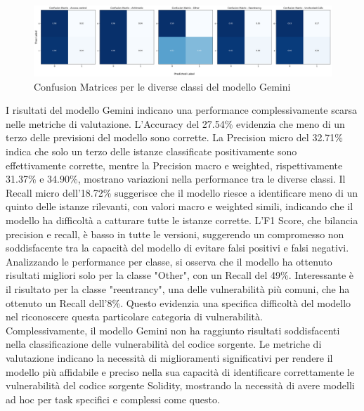\documentclass[../../Thesis.tex]{subfiles}
\begin{document}
\begin{figure}[H]
    \includegraphics[width=1.05\textwidth]{../../img/CF-Gemini.png}
    \caption{Confusion Matrices per le diverse classi del modello Gemini}
\end{figure}
    I risultati del modello Gemini indicano una performance complessivamente scarsa nelle metriche di valutazione. L'Accuracy del 27.54\% evidenzia che meno di un terzo delle previsioni del modello sono corrette. La Precision micro del 32.71\% indica che solo un terzo delle istanze classificate positivamente sono effettivamente corrette, mentre la Precision macro e weighted, rispettivamente 31.37\% e 34.90\%, mostrano variazioni nella performance tra le diverse classi. Il Recall micro dell'18.72\% suggerisce che il modello riesce a identificare meno di un quinto delle istanze rilevanti, con valori macro e weighted simili, indicando che il modello ha difficoltà a catturare tutte le istanze corrette. L'F1 Score, che bilancia precision e recall, è basso in tutte le versioni, suggerendo un compromesso non soddisfacente tra la capacità del modello di evitare falsi positivi e falsi negativi.\\
    Analizzando le performance per classe, si osserva che il modello ha ottenuto risultati migliori solo per la classe "Other", con un Recall del 49\%. Interessante è il risultato per la classe "reentrancy", una delle vulnerabilità più comuni, che ha ottenuto un Recall dell'8\%. Questo evidenzia una specifica difficoltà del modello nel riconoscere questa particolare categoria di vulnerabilità.\\
    Complessivamente, il modello Gemini non ha raggiunto risultati soddisfacenti nella classificazione delle vulnerabilità del codice sorgente. Le metriche di valutazione indicano la necessità di miglioramenti significativi per rendere il modello più affidabile e preciso nella sua capacità di identificare correttamente le vulnerabilità del codice sorgente Solidity, mostrando la necessità di avere modelli ad hoc per task specifici e complessi come questo.
\end{document}

